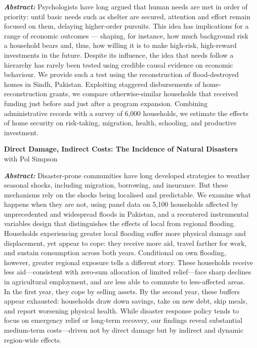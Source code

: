 \documentclass[10.5pt]{article}
\newcommand{\paperabstract}[1]{%
  \vspace{.15cm}%
  \begin{list}{}{%
    \setlength{\leftmargin}{1.4em}%
    \setlength{\rightmargin}{0em}%
    \setlength{\topsep}{0pt}%
    \setlength{\partopsep}{0pt}%
    \setlength{\itemsep}{0pt}%
    \setlength{\parsep}{0pt}%
  }%
  \item[] {\small\textbf{\textit{Abstract:}} #1}%
  \end{list}%
  \vspace{.4cm}%
}
\begin{document}
\paperabstract{Psychologists have long argued that human needs are met in order of priority: until basic needs such as shelter are secured, attention and effort remain focused on them, delaying higher-order pursuits. This idea has implications for a range of economic outcomes — shaping, for instance, how much background risk a household bears and, thus, how willing it is to make high-risk, high-reward investments in the future. Despite its influence, the idea that needs follow a hierarchy has rarely been tested using credible causal evidence on economic behaviour. We provide such a test using the reconstruction of flood-destroyed homes in Sindh, Pakistan. Exploiting staggered disbursements of home-reconstruction grants, we compare otherwise-similar households that received funding just before and just after a program expansion. Combining administrative records with a survey of 6,000 households, we estimate the effects of home security on risk-taking, migration, health, schooling, and productive investment.}


\textbf{{Direct Damage, Indirect Costs: The Incidence of Natural Disasters}} \vspace*{.1cm} \\with Pol Simpson 

\paperabstract{Disaster-prone communities have long developed strategies to weather seasonal shocks, including migration, borrowing, and insurance. But these mechanisms rely on the shocks being localised and predictable. We examine what happens when they are not, using panel data on 5,100 households affected by unprecedented and widespread floods in Pakistan, and a recentered instrumental variables design that distinguishes the effects of local from regional flooding. Households experiencing greater local flooding suffer more physical damage and displacement, yet appear to cope: they receive more aid, travel farther for work, and sustain consumption across both years. Conditional on own flooding, however, greater regional exposure tells a different story. These households receive less aid—consistent with zero-sum allocation of limited relief—face sharp declines in agricultural employment, and are less able to commute to less-affected areas. In the first year, they cope by selling assets. By the second year, these buffers appear exhausted: households draw down savings, take on new debt, skip meals, and report worsening physical health. While disaster response policy tends to focus on emergency relief or long-term recovery, our findings reveal substantial medium-term costs—driven not by direct damage but by indirect and dynamic region-wide effects.}
\end{document}
